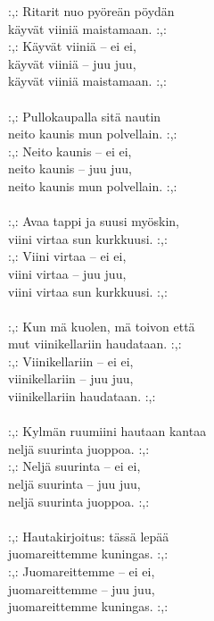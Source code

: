 
:,: Ritarit nuo pyöreän pöydän \\ käyvät viiniä maistamaan. :,: \\ :,: Käyvät viiniä -- ei ei, \\ käyvät viiniä -- juu juu, \\ käyvät viiniä maistamaan. :,: \\ \hspace{10mm} \\ :,: Pullokaupalla sitä nautin \\ neito kaunis mun polvellain. :,: \\ :,: Neito kaunis -- ei ei, \\ neito kaunis -- juu juu, \\ neito kaunis mun polvellain. :,: \\ \hspace{10mm} \\ :,: Avaa tappi ja suusi myöskin, \\ viini virtaa sun kurkkuusi. :,: \\ :,: Viini virtaa -- ei ei, \\ viini virtaa -- juu juu, \\ viini virtaa sun kurkkuusi. :,: \\ \hspace{10mm} \\ :,: Kun mä kuolen, mä toivon että \\ mut viinikellariin haudataan. :,: \\ :,: Viinikellariin -- ei ei, \\ viinikellariin -- juu juu, \\ viinikellariin haudataan. :,: \\ \hspace{10mm} \\ :,: Kylmän ruumiini hautaan kantaa \\ neljä suurinta juoppoa. :,: \\ :,: Neljä suurinta -- ei ei, \\ neljä suurinta -- juu juu, \\ neljä suurinta juoppoa. :,: \\ \hspace{10mm} \\ :,: Hautakirjoitus: tässä lepää \\ juomareittemme kuningas. :,: \\ :,: Juomareittemme -- ei ei, \\ juomareittemme -- juu juu, \\ juomareittemme kuningas. :,:
